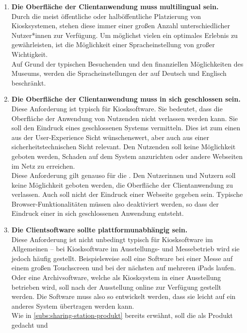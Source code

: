 \begin{enumerate}[label=\textbf{NFA\arabic*}]
  \item\label{nfa3} \textbf{Die Oberfläche der Clientanwendung muss multilingual sein.}\\
  Durch die meist öffentliche oder halböffentliche Platzierung von Kiosksystemen, stehen diese
  immer einer großen Anzahl unterschiedlicher Nutzer*innen zur Verfügung. Um möglichst vielen
  ein optimales Erlebnis zu gewährleisten, ist die Möglichkeit einer Spracheinstellung von großer Wichtigkeit.\\
  Auf Grund der typischen Besuchenden und den finanziellen Möglichkeiten des Museums, werden die 
  Spracheinstellungen der \shst{} auf Deutsch und Englisch beschränkt.
  \item\label{nfa4} \textbf{Die Oberfläche der Clientanwendung muss in sich geschlossen sein.}\\
  Diese Anforderung ist typisch für Kiosksoftware. Sie bedeutet, dass die Oberfläche der Anwendung von Nutzenden 
  nicht verlassen werden kann. Sie soll den Eindruck eines geschlossenen Systems vermitteln. Dies ist zum einen
  aus der User-Experience Sicht wünschenswert, aber auch aus einer sicherheitstechnischen Sicht relevant. Den 
  Nutzenden soll keine Möglichkeit geboten werden, Schaden auf dem System anzurichten oder andere Webseiten
  im Netz zu erreichen.\\
  Diese Anforderung gilt genauso für die \shst{}. Den Nutzerinnen und Nutzern soll keine Möglichkeit geboten werden, die
  Oberfläche der Clientanwendung zu verlassen. Auch soll nicht der Eindruck einer Webseite gegeben sein. 
  Typische Browser-Funktionalitäten müssen also deaktiviert werden, so dass der Eindruck 
  einer in sich geschlossenen Anwendung entsteht.
  \item\label{nfa6} \textbf{Die Clientsoftware sollte plattformunabhängig sein.}\\
  Diese Anforderung ist nicht unbedingt typisch für Kiosksoftware im Allgemeinen -- bei Kiosksoftware im Ausstellungs- und
  Messebetrieb wird sie jedoch häufig gestellt. Beispielsweise soll eine Software bei einer Messe auf einem
  großen Touchscreen und bei der nächsten auf mehreren iPads laufen. Oder eine Archivsoftware, welche als Kiosksystem
  in einer Ausstellung betrieben wird, soll nach der Ausstellung online zur Verfügung gestellt werden. Die Software
  muss also so entwickelt werden, dass sie leicht auf ein anderes System übertragen werden kann. \\ 
  Wie in \autoref{subs:sharing-station-produkt} bereits erwähnt, soll die \shst{} als Produkt gedacht und

\end{enumerate}
